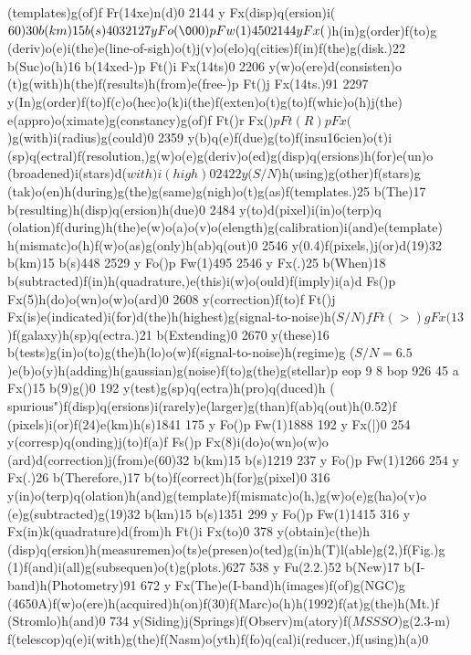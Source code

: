 {{{{{{{{{{{{{{{{{{{(templates)g(of)f Fr(\014xe)n(d)0 2144 y Fx(disp)q(ersion)i(\(60)30
b(km)15 b(s)403 2127 y Fo(\000)p Fw(1)450 2144 y Fx(\))h(in)g(order)f(to)g
(deriv)o(e)i(the)e(line-of-sigh)o(t)j(v)o(elo)q(cities)f(in)f(the)g(disk.)22
b(Suc)o(h)16 b(\014xed-)p Ft()i Fx(\014ts)0 2206 y(w)o(ere)d(consisten)o
(t)g(with)h(the)f(results)h(from)e(free-)p Ft()j Fx(\014ts.)91
2297 y(In)g(order)f(to)f(c)o(hec)o(k)i(the)f(exten)o(t)g(to)f(whic)o(h)j(the)
e(appro)o(ximate)g(constancy)g(of)f Ft()r Fx(\()p Ft(R)p
Fx(\))g(with)i(radius)g(could)0 2359 y(b)q(e)f(due)g(to)f(insu\016cien)o(t)i
(sp)q(ectral)f(resolution,)g(w)o(e)g(deriv)o(ed)g(disp)q(ersions)h(for)e(un)o
(broadened)i(stars)d(\(with)i(high)0 2422 y(S/N\))h(using)g(other)f(stars)g
(tak)o(en)h(during)g(the)g(same)g(nigh)o(t)g(as)f(templates.)25
b(The)17 b(resulting)h(disp)q(ersion)h(due)0 2484 y(to)d(pixel)i(in)o(terp)q
(olation)f(during)h(the)e(w)o(a)o(v)o(elength)g(calibration)i(and)e(template)
h(mismatc)o(h)f(w)o(as)g(only)h(ab)q(out)0 2546 y(0.4)f(pixels,)j(or)d(19)32
b(km)15 b(s)448 2529 y Fo()p Fw(1)495 2546 y Fx(.)25 b(When)18
b(subtracted)f(in)h(quadrature,)e(this)i(w)o(ould)f(imply)i(a)d
Fs()p Fx(5)h(do)o(wn)o(w)o(ard)0 2608 y(correction)f(to)f
Ft()j Fx(is)e(indicated)i(for)d(the)h(highest)g(signal-to-noise)h(\(S/N)f
Ft(>)g Fx(13\))f(galaxy)h(sp)q(ectra.)21 b(Extending)0 2670
y(these)16 b(tests)g(in)o(to)g(the)h(lo)o(w)f(signal-to-noise)h(regime)g
(\(S/N=6.5\))e(b)o(y)h(adding)h(gaussian)g(noise)f(to)g(the)g(stellar)p
eop
9 8 bop 926 45 a Fx({)15 b(9)g({)0 192 y(test)g(sp)q(ectra)h(pro)q(duced)h
(\\spurious")f(disp)q(ersions)i(rarely)e(larger)g(than)f(ab)q(out)h(0.52)f
(pixels)i(or)f(24)e(km)h(s)1841 175 y Fo()p Fw(1)1888 192
y Fx(|)0 254 y(corresp)q(onding)j(to)f(a)f Fs()p Fx(8)i(do)o(wn)o(w)o
(ard)d(correction)j(from)e(60)32 b(km)15 b(s)1219 237 y Fo()p
Fw(1)1266 254 y Fx(.)26 b(Therefore,)17 b(to)f(correct)h(for)g(pixel)0
316 y(in)o(terp)q(olation)h(and)g(template)f(mismatc)o(h,)g(w)o(e)g(ha)o(v)o
(e)g(subtracted)g(19)32 b(km)15 b(s)1351 299 y Fo()p Fw(1)1415
316 y Fx(in)k(quadrature)d(from)h Ft()i Fx(to)0 378 y(obtain)c(the)h
(disp)q(ersion)h(measuremen)o(ts)e(presen)o(ted)g(in)h(T)l(able)g(2,)f(Fig.)g
(1)f(and)i(all)g(subsequen)o(t)g(plots.)627 538 y Fu(2.2.)52
b(New)17 b(I-band)h(Photometry)91 672 y Fx(The)e(I-band)h(images)f(of)g(NGC)g
(4650A)f(w)o(ere)h(acquired)h(on)f(30)f(Marc)o(h)h(1992)f(at)g(the)h(Mt.)f
(Stromlo)h(and)0 734 y(Siding)j(Springs)f(Observ)m(atory)f(\(MSSSO\))g(2.3-m)
f(telescop)q(e)i(with)g(the)f(Nasm)o(yth)f(fo)q(cal)i(reducer,)f(using)h(a)0
}}}}}}}}}}}}}}}}}}}}}
